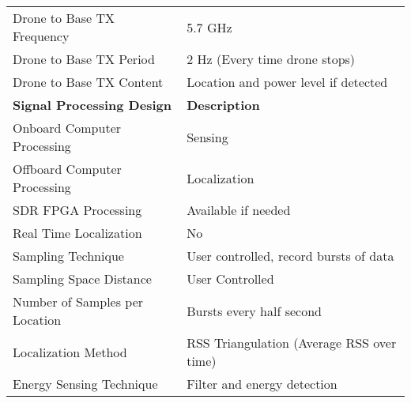 \begin{table}[h!]
\begin{tabular}{|l|l|}
            Drone to Base TX Frequency            & 5.7 GHz                                   \\
            Drone to Base TX Period               & 2 Hz (Every time drone stops)             \\
            Drone to Base TX Content              & Location and power level if detected      \\
    \hline  \textbf{Signal Processing Design}     & \textbf{Description}                      \\ \hline
            Onboard Computer Processing           & Sensing                                   \\
            Offboard Computer Processing          & Localization                              \\
            SDR FPGA Processing                   & Available if needed                       \\
            Real Time Localization                & No                                        \\
            Sampling Technique                    & User controlled, record bursts of data    \\
            Sampling Space Distance               & User Controlled                           \\
            Number of Samples per Location        & Bursts every half second                  \\
            Localization Method                   & RSS Triangulation (Average RSS over time) \\
            Energy Sensing Technique              & Filter and energy detection               \\ \hline
\end{tabular}
\end{table}\par
\pagebreak
